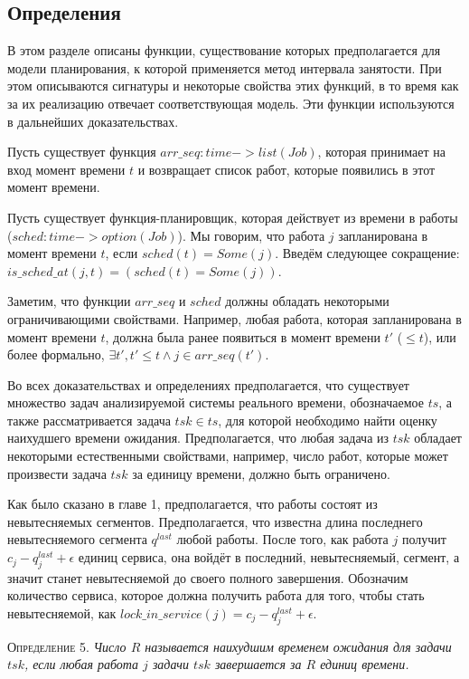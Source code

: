 \documentclass[14pt]{matmex-diploma-custom}
\begin{document}
\subsection{Определения}

В этом разделе описаны функции, существование которых предполагается для модели планирования, к которой применяется метод интервала занятости. При этом описываются сигнатуры и некоторые свойства этих функций, в то время как за их реализацию отвечает соответствующая модель. Эти функции используются в дальнейших доказательствах. 

Пусть существует функция $arr\_seq: time -> list(Job)$, которая принимает на вход 
  момент времени $t$ и возвращает список работ, которые появились в этот момент времени.

Пусть существует функция-планировщик, которая действует из времени в
  работы ($sched: time -> option(Job)$). Мы говорим, что работа $j$ запланирована 
  в момент времени $t$, если $sched(t) = Some(j)$. Введём следующее сокращение: 
  $is\_sched\_at(j,t) = (sched(t) = Some(j))$.
  
Заметим, что функции $arr\_seq$ и $sched$ должны обладать некоторыми ограничивающими свойствами. 
  Например, любая работа, которая запланирована в момент времени $t$, 
  должна была ранее появиться в момент времени $t'$ ($\leq t$), или более формально, $\exists t', t' \leq t \wedge j \in arr\_seq (t')$.


Во всех доказательствах и определениях предполагается, что существует множество 
  задач анализируемой системы реального времени, обозначаемое $ts$, 
  а также рассматривается задача $tsk \in ts$, для которой необходимо 
  найти оценку наихудшего времени ожидания. Предполагается, что любая задача из $tsk$ 
  обладает некоторыми естественными свойствами, например, число работ, которые может 
  произвести задача $tsk$ за единицу времени, должно быть ограничено. 

Как было сказано в главе 1, предполагается, что работы состоят из невытесняемых сегментов. 
  Предполагается, что известна длина последнего невытесняемого сегмента $q^{last}$ любой работы.
  После того, как работа $j$ получит $c_{j} - q_j^{last} + \epsilon$ единиц сервиса, 
  она войдёт в последний, невытесняемый, сегмент, а значит станет невытесняемой 
  до своего полного завершения. Обозначим количество сервиса, которое должна получить работа для того, 
  чтобы стать невытесняемой, как $lock\_in\_service(j) = c_{j} - q_j^{last} + \epsilon$. 

\textsc{Определение 5.}
\textit{Число $R$ называется наихудшим временем ожидания для задачи $tsk$, если 
  любая работа $j$ задачи $tsk$ завершается за $R$ единиц времени.}
\end{document}
